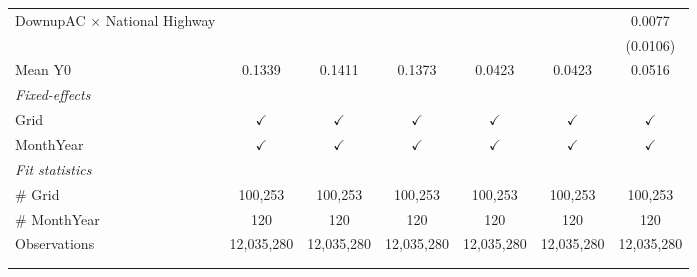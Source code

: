 \begin{table}[htbp]
\begin{tabular}{lcccccc}
      DownupAC $\times$ National Highway                         &               &               &               &               &               & 0.0077\\   
                                                                 &               &               &               &               &               & (0.0106)\\   
      \hline Mean Y0                                             & 0.1339        & 0.1411        & 0.1373        & 0.0423        & 0.0423        & 0.0516\\  
      \midrule
      \emph{Fixed-effects}\\
      Grid                                                       & $\checkmark$  & $\checkmark$  & $\checkmark$  & $\checkmark$  & $\checkmark$  & $\checkmark$\\   
      MonthYear                                                  & $\checkmark$  & $\checkmark$  & $\checkmark$  & $\checkmark$  & $\checkmark$  & $\checkmark$\\   
      \midrule
      \emph{Fit statistics}\\
      \# Grid                                                    & 100,253       & 100,253       & 100,253       & 100,253       & 100,253       & 100,253\\  
      \# MonthYear                                               & 120           & 120           & 120           & 120           & 120           & 120\\  
      Observations                                               & 12,035,280    & 12,035,280    & 12,035,280    & 12,035,280    & 12,035,280    & 12,035,280\\  
      \midrule \midrule
                                                                 &               &               &               &               &               &  \tabularnewline 
      \\
   \end{tabular}
\end{table}


